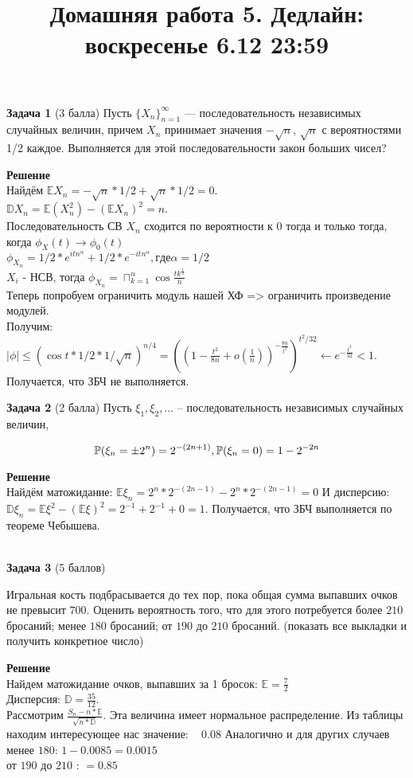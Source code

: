 \documentclass{article}
\title{Домашняя работа 5. Дедлайн: воскресенье 6.12 23:59}
\begin{document}
\maketitle
\textbf{Задача 1} (3 балла)
 Пусть $\{X_n\}_{n=1}^{\infty}$ — последовательность независимых случайных величин, причем
$X_n$ принимает значения $- \sqrt{n}$, $\sqrt{n}$ с вероятностями 1/2 каждое. Выполняется для этой последовательности закон больших чисел?

\textbf{Решение} \\
Найдём $\mathbb E X_n = -\sqrt{n} * 1/2 + \sqrt{n} * 1/2 = 0$.\\
$\mathbb D X_n = \mathbb E(X_n^2) - (\mathbb E X_n)^2 = n$.\\
Последовательность СВ $X_n$ сходится по вероятности к 0 тогда и только тогда, когда $\phi_{X}(t) \longrightarrow \phi_0(t)$ \\
$\phi_{X_n} = 1/2 * e^{itn^\alpha} + 1/2 * e^{-itn^\alpha}, где \alpha = 1/2$ \\
$X_i$ - НСВ, тогда $\phi_{X_n} = \sqcap_{k=1}^{n} \cos{\frac{tk^{\frac{1}{2}}}{n}}$\\
Теперь попробуем ограничить модуль нашей ХФ => ограничить произведение модулей.\\ Получим: $|\phi| \leq (\cos{t * 1/2 * 1/\sqrt{n}})^{n/4} = 
((1-\frac{t^2}{8n}+o(\frac{1}{n}))^{-\frac{8n}{t^2}})^{t^2/32} \longleftarrow e^{-\frac{t^2}{32}} < 1$. Получается, что ЗБЧ не выполняется.



\textbf{Задача 2} (2 балла)
Пусть $\xi_1, \xi_2, \dots$ -- последовательность независимых случайных величин,

$$\mathbb{P}(\xi_n = \pm2^n) = 2^{-(2n+1)}, \space \mathbb{P}(\xi_n = 0) = 1 - 2^{-2n}$$

\textbf{Решение} \\
Найдём матожидание: $\mathbb E \xi_n = 2^n * 2^{-(2n-1)} - 2^n * 2^{-(2n-1)} = 0$
И дисперсию: $\mathbb D \xi_n = \mathbb E \xi^2 - (\mathbb E \xi)^2 = 2^{-1} + 2^{-1} + 0 = 1$.
Получается, что ЗБЧ выполняется по теореме Чебышева.


\\
\textbf{Задача 3} (5 баллов)

Игральная кость подбрасывается до тех пор, пока общая сумма выпавших очков не превысит $700$. Оценить вероятность того, что для этого потребуется более $210$ бросаний; менее $180$ бросаний; от $190$ до $210$ бросаний. (показать все выкладки и получить конкретное число)

\textbf{Решение} \\
Найдем матожидание очков, выпавших за 1 бросок: $\mathbb E = \frac{7}{2}$ \\
Дисперсия: $\mathbb D = \frac{35}{12}$. \\
Рассмотрим $\frac{S_n - n * \mathbb E}{\sqrt{n * \mathbb D}}$. Эта величина имеет нормальное распределение. Из таблицы находим интересующее нас значение: ~ $0.08$
Аналогично и для других случаев \\
менее $180$: $1 - 0.0085 = 0.0015$ \\
от $190$ до $210$ : $= 0.85$
\end{document}
